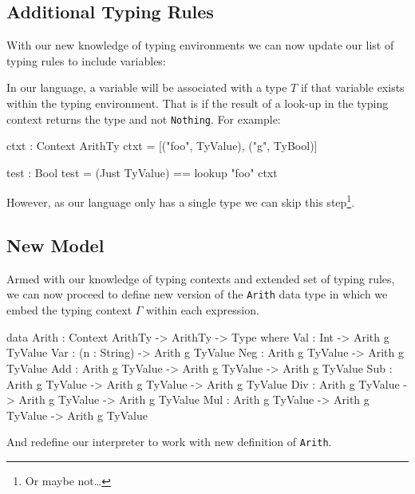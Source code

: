 \subsection{Additional Typing Rules}
\label{sec:typed-arith-var:typing-rules}

With our new knowledge of typing environments we can now update our list of typing rules to include variables:

\begin{prooftree}
\end{prooftree}

\noindent
In our language, a variable will be associated with a type $T$ if that variable exists within the typing environment.
That is if the result of a look-up in the typing context returns the type and not \texttt{Nothing}.
For example:

\begin{code}
ctxt : Context ArithTy
ctxt = [("foo", TyValue), ("g", TyBool)]

test : Bool
test = (Just TyValue) == lookup "foo" ctxt
\end{code}

\noindent
However, as our language only has a single type we can skip this step\footnote{Or maybe not\ldots}.

\subsection{New Model}
\label{sec:typed-arith-var:model}

Armed with our knowledge of typing contexts and extended set of typing rules, we can now proceed to define new version of the \texttt{Arith} data type in which we embed the typing context $\Gamma$ within each expression.

\begin{code}
data Arith : Context ArithTy -> ArithTy -> Type where
  Val : Int                                -> Arith g TyValue
  Var : (n : String)                       -> Arith g TyValue
  Neg : Arith g TyValue                    -> Arith g TyValue
  Add : Arith g TyValue -> Arith g TyValue -> Arith g TyValue
  Sub : Arith g TyValue -> Arith g TyValue -> Arith g TyValue
  Div : Arith g TyValue -> Arith g TyValue -> Arith g TyValue
  Mul : Arith g TyValue -> Arith g TyValue -> Arith g TyValue
\end{code}

\noindent
And redefine our interpreter to work with new definition of \texttt{Arith}.


